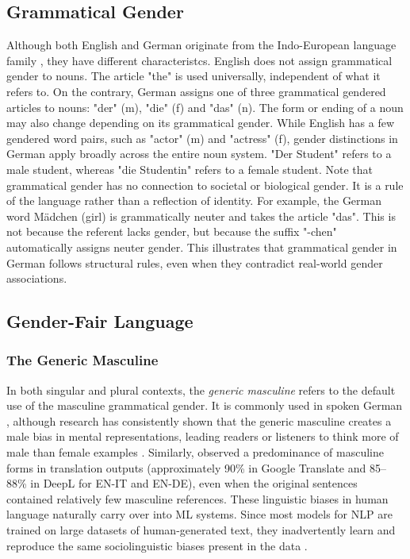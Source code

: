 \subsection{Grammatical Gender}
Although both English and German originate from the Indo-European language family \citep{baldiEnglishIndoEuropeanLanguage2008}, they have different characteristcs. English does not assign grammatical gender to nouns. The article "the" is used universally, independent of what it refers to. On the contrary, German assigns one of three grammatical gendered articles to nouns: "der" (m), "die" (f) and "das" (n). The form or ending of a noun may also change depending on its grammatical gender. While English has a few gendered word pairs, such as "actor" (m) and "actress" (f), gender distinctions in German apply broadly across the entire noun system. "Der Student" refers to a male student, whereas "die Studentin" refers to a female student. Note that grammatical gender has no connection to societal or biological gender. It is a rule of the language rather than a reflection of identity. For example, the German word Mädchen (girl) is grammatically neuter and takes the article "das". This is not because the referent lacks gender, but because the suffix "-chen" automatically assigns neuter gender. This illustrates that grammatical gender in German follows structural rules, even when they contradict real-world gender associations.

\subsection{Gender-Fair Language}

\subsubsection{The Generic Masculine} \label{subsection:generic_masculine}
In both singular and plural contexts, the \textit{generic masculine} refers to the default use of the masculine grammatical gender. It is commonly used in spoken German \citep{lardelliBuildingBridgesDataset2024,schmitzGermanAllProfessors2022}, although research has consistently shown that the generic masculine creates a male bias in mental representations, leading readers or listeners to think more of male than female examples \citep{sczesnyCanGenderFairLanguage2016}. Similarly, \citet{rescignoGenderBiasMachine2023} observed a predominance of masculine forms in translation outputs (approximately 90\% in Google Translate and 85–88\% in DeepL for EN-IT and EN-DE), even when the original sentences contained relatively few masculine references. These linguistic biases in human language naturally carry over into ML systems. Since most models for NLP are trained on large datasets of human-generated text, they inadvertently learn and reproduce the same sociolinguistic biases present in the data \citep{choMeasuringGenderBias2019}.

